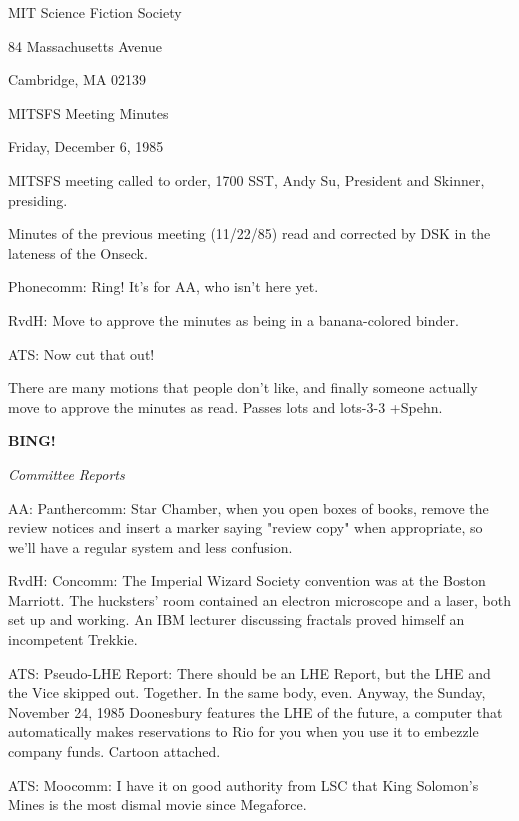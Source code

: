 \documentclass[12pt]{article}
\newcommand{\bing}{{\bf BING!} }
\newcommand{\goto}[1]{\bing \vskip 12pt \centerline{{\em{#1}}}}
\begin{document}
\begin{center}

MIT Science Fiction Society 

84 Massachusetts Avenue

Cambridge, MA 02139

\vspace{12pt}

MITSFS Meeting Minutes 

Friday, December 6, 1985

\end{center}
 
\vspace{18pt}

\setlength{\parskip}{6pt}

\noindent
MITSFS meeting called to order, 1700 SST,
Andy Su, President and Skinner, presiding.

Minutes of the previous meeting (11/22/85) read and corrected by DSK in the lateness of the Onseck.

Phonecomm: Ring! It's for AA, who isn't here yet.

RvdH: Move to approve the minutes as being in a banana-colored binder.

ATS: Now cut that out!

There are many motions that people don't like, and finally someone actually move to approve the minutes as read. Passes lots and lots-3-3 +Spehn.

\goto{Committee Reports}

AA: Panthercomm: Star Chamber, when you open boxes of books, remove the review notices and insert a marker saying "review copy" when appropriate, so we'll have a regular system and less confusion.

RvdH: Concomm: The Imperial Wizard Society convention was at the Boston Marriott. The hucksters' room contained an electron microscope and a laser, both set up and working. An IBM lecturer discussing fractals proved himself an incompetent Trekkie.

ATS: Pseudo-LHE Report: There should be an LHE Report, but the LHE and the Vice skipped out. Together. In the same body, even. Anyway, the Sunday, November 24, 1985 Doonesbury features the LHE of the future, a computer that automatically makes reservations to Rio for you when you use it to embezzle company funds. Cartoon attached.

ATS: Moocomm: I have it on good authority from LSC that King Solomon's Mines is the most dismal movie since Megaforce.
\end{document}
